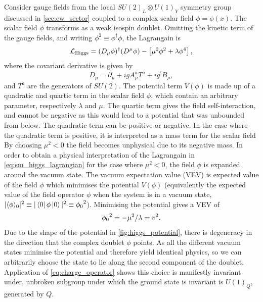 Consider gauge fields from the local $SU(2)_L \otimes U(1)_Y$ symmetry group discussed in \cref{sec:ew_sector} coupled to a complex scalar field $\phi = \phi(x)$. The scalar field $\phi$ transforms as a weak isospin doublet.
Omitting the kinetic term of the gauge fields, and writing $\phi^2 \equiv \phi^\dagger \phi$, the Lagrangain is
%
\begin{equation}\label{eq:sm_higgs_lagrangian}
  \mathcal{L}_{\textnormal{Higgs}} = 
  (D_\mu \phi)^\dagger (D^\mu \phi) - \left[ \mu^2 \phi^2 + \lambda \phi^4 \right],
\end{equation}
%
where the covariant derivative is given by
%
\begin{equation}\label{eq:sm_higgs_cov_derivative}
  D_\mu = \partial_\mu + i g A^a_\mu T^a + i g^\prime B_\mu ,
\end{equation}
%
and $T^a$ are the generators of $SU(2)$.
The potential term $V(\phi)$ is made up of a quadratic and quartic term in the scalar field $\phi$, which contain an arbitrary parameter, respectively $\lambda$ and $\mu$.
The quartic term gives the field self-interaction, and cannot be negative as this would lead to a potential that was unbounded from below.
The quadratic term can be positive or negative.
In the case where the quadratic term is positive, it is interpreted as a mass term for the scalar field
By choosing $\mu^2 < 0$ the field becomes unphysical due to its negative mass.
In order to obtain a physical interpretation of the Lagrangain in \cref{eq:sm_higgs_lagrangian} for the case where $\mu^2 < 0$, the field $\phi$ is expanded around the vacuum state.
The vacuum expectation value (VEV) is expected value of the field $\phi$ which minimises the potential $V(\phi)$ (equivalently the expected value of the field operator $\phi$ when the system is in a vacuum state, $|\langle{\phi}\rangle_0|^2 \equiv |\left\langle 0 \right| \phi \left| 0 \right\rangle|^2 \equiv {\phi_0}^2$).
Minimising the potential gives a VEV of
%
\begin{equation}\label{eq:higgs_vev}
  {\phi_0}^2 = -\mu^2 / \lambda = v^2 .
\end{equation}
%
Due to the shape of the potential in \cref{fig:higgs_potential}, there is degeneracy in the direction that the complex doublet $\phi$ points.
As all the different vacuum states minimise the potential and therefore yield identical physics, so we can arbitrarily choose the state to lie along the second component of the doublet.
Application of \cref{eq:charge_operator} shows this choice is manifestly invariant under, unbroken subgroup under which the ground state is invariant is $U(1)_Q$, generated by $Q$.

